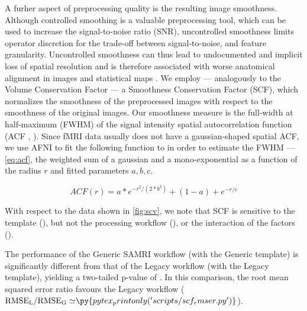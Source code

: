 A furher aspect of preprocessing quality is the resulting image smoothness.
Although controlled smoothing is a valuable preprocessing tool, which can be used to increase the signal-to-noise ratio (SNR), uncontrolled smoothness limits operator discretion for the trade-off between signal-to-noise, and feature granularity.
Uncontrolled smoothness can thus lead to undocumented and implicit loss of spatial resolution and is therefore associated with worse anatomical alignment in images and statistical maps \cite{fmriprep}.
We employ --- analogously to the Volume Conservation Factor --- a Smoothness Conservation Factor (SCF), which normalizes the smoothness of the preprocessed images with respect to the smoothness of the original images.
Our smoothness measure is the full-width at half-maximum (FWHM) of the signal intensity spatial autocorrelation function (ACF \cite{eklund2016cluster}, \cite{cox2017fmri}).
Since fMRI data usually does not have a gaussian-shaped spatial ACF, we use AFNI \cite{cox1996afni} to fit the following function to in order to estimate the FWHM ---
\cref{eq:acf}, the weighted sum of a gaussian and a mono-exponential as a function of the radius $r$ and fitted parameters $a,b,c$.

\begin{equation} \label{eq:acf}
        ACF(r)
        = a * e^{ -r^{2}/ (2 * b^{2}) } + (1 - a) + e^{-r/c}
\end{equation}

With respect to the data shown in \cref{fig:scv}, we note that SCF is sensitive to
the template (),
but not
the processing workflow (),
or the interaction of the factors ().

The performance of the Generic SAMRI workflow (with the Generic template) is significantly different from that of the Legacy workflow (with the Legacy template), yielding a two-tailed p-value of .
In this comparison, the root mean squared error ratio favours the Legacy workflow
($\mathrm{RMSE_{L}/RMSE_{G}\simeq} \py{pytex_printonly('scripts/scf_rmser.py')}$).

